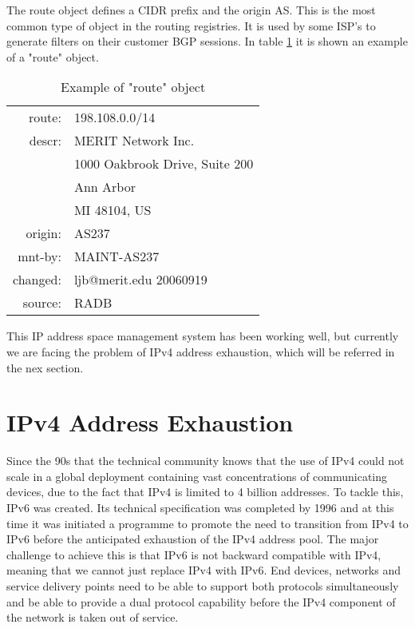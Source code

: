 \documentclass[11pt,a4paper]{scrreprt}
\begin{document}
The route object defines a CIDR prefix and the origin AS. This is the most common type of object in the routing registries. It is used by some ISP's to generate filters on their customer BGP sessions. In table \ref{table:6} it is shown an example of a "route" object. 	

\begin{table}[!h]
\centering
\begin{tabular}{  r  l  }

route:   	&      198.108.0.0/14\\
descr:    	&      MERIT Network Inc.\\
			&		1000 Oakbrook Drive, Suite 200\\ 
 			&		Ann Arbor \\
 			&		MI 48104, US\\
origin:    	&      AS237\\
mnt-by:    	&      MAINT-AS237\\
changed:   	&      ljb@merit.edu 20060919\\
source:   	&      RADB\\

\end{tabular}
\caption{Example of "route" object}
\label{table:6}
\end{table}

This IP address space management system has been working well, but currently we are facing the problem of IPv4 address exhaustion, which will be referred in the nex section.

\section{IPv4 Address Exhaustion}

Since the 90s that the technical community knows that the use of IPv4 could not scale in a global deployment containing vast concentrations of communicating devices, due to the fact that IPv4 is limited to 4 billion addresses. To tackle this, IPv6 was created. Its technical specification was completed by 1996 and at this time it was initiated a programme to promote the need to transition from IPv4 to IPv6 before the anticipated exhaustion of the IPv4 address pool. The major challenge to achieve this is that IPv6 is not backward compatible with IPv4, meaning that we cannot just replace IPv4 with IPv6. End devices, networks and service delivery points need to be able to support both protocols simultaneously and be able to provide a dual protocol capability before the IPv4 component of the network is taken out of service.     
\end{document}
